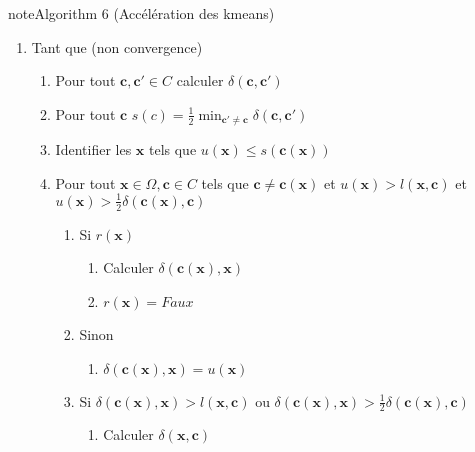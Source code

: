 \documentclass[letterpaper,10pt,french]{sphinxmanual}
\begin{document}
\begin{sphinxadmonition}{note}{Algorithm 6 (Accélération des k\sphinxhyphen{}means)}
\begin{enumerate}
\begin{enumerate}
\item {} 
\sphinxAtStartPar
\(u(\mathbf x,\mathbf c)=\displaystyle\min_{\mathbf c\in C} \delta(\mathbf x,\mathbf c)\)

\end{enumerate}

\item {} 
\sphinxAtStartPar
Tant que (non convergence)
\begin{enumerate}
%
\item {} 
\sphinxAtStartPar
Pour tout \(\mathbf c,\mathbf {c'}\in C\) calculer \(\delta (\mathbf c,\mathbf {c'})\)

\item {} 
\sphinxAtStartPar
Pour tout \(\mathbf c\) \(s(c)= \frac{1}{2}\displaystyle\min_{\mathbf {c'}\neq \mathbf c} \delta(\mathbf c,\mathbf {c'})\)

\item {} 
\sphinxAtStartPar
Identifier les \(\mathbf x\) tels que \(u(\mathbf x)\leq s(\mathbf c(\mathbf x))\)

\item {} 
\sphinxAtStartPar
Pour tout \(\mathbf x\in \Omega,\mathbf c\in C\) tels que \(\mathbf c\neq \mathbf c(\mathbf x)\) et \(u(\mathbf x)>l(\mathbf x,\mathbf c)\) et \(u(\mathbf x)>\frac{1}{2}\delta(\mathbf c(\mathbf x),\mathbf c)\)
\begin{enumerate}
%
\item {} 
\sphinxAtStartPar
Si \(r(\mathbf x)\)
\begin{enumerate}
%
\item {} 
\sphinxAtStartPar
Calculer \(\delta(\mathbf c(\mathbf x),\mathbf x)\)

\item {} 
\sphinxAtStartPar
\(r(\mathbf x)=Faux\)

\end{enumerate}

\item {} 
\sphinxAtStartPar
Sinon
\begin{enumerate}
%
\item {} 
\sphinxAtStartPar
\(\delta(\mathbf c(\mathbf x),\mathbf x)=u(\mathbf x)\)

\end{enumerate}

\item {} 
\sphinxAtStartPar
Si \(\delta(\mathbf c(\mathbf x),\mathbf x)>l(\mathbf x,\mathbf c)\)  ou \(\delta(\mathbf c(\mathbf x),\mathbf x)>\frac{1}{2}\delta(\mathbf c(\mathbf x),\mathbf c)\)
\begin{enumerate}
%
\item {} 
\sphinxAtStartPar
Calculer \(\delta(\mathbf x,\mathbf c)\)


\end{enumerate}
\end{enumerate}
\end{enumerate}
\end{enumerate}
\end{sphinxadmonition}
\end{document}
